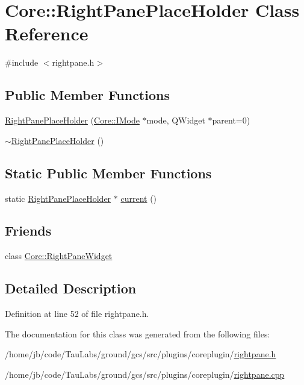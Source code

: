 \hypertarget{class_core_1_1_right_pane_place_holder}{\section{\-Core\-:\-:\-Right\-Pane\-Place\-Holder \-Class \-Reference}
\label{class_core_1_1_right_pane_place_holder}
}


{\ttfamily \#include $<$rightpane.\-h$>$}

\subsection*{\-Public \-Member \-Functions}
\begin{DoxyCompactItemize}
\item 
\hyperlink{group___core_plugin_gaa98e96e4dc0e41e99b50b305ff9fad3f}{\-Right\-Pane\-Place\-Holder} (\hyperlink{class_core_1_1_i_mode}{\-Core\-::\-I\-Mode} $\ast$mode, \-Q\-Widget $\ast$parent=0)
\item 
\hyperlink{group___core_plugin_gaf01c936611ccfda71b72c4cf3018edfd}{$\sim$\-Right\-Pane\-Place\-Holder} ()
\end{DoxyCompactItemize}
\subsection*{\-Static \-Public \-Member \-Functions}
\begin{DoxyCompactItemize}
\item 
static \hyperlink{class_core_1_1_right_pane_place_holder}{\-Right\-Pane\-Place\-Holder} $\ast$ \hyperlink{group___core_plugin_ga78b79d10a15088de40b5fea71c4add4c}{current} ()
\end{DoxyCompactItemize}
\subsection*{\-Friends}
\begin{DoxyCompactItemize}
\item 
class \hyperlink{group___core_plugin_gacfc5dac0611e5189b4f2dcbeface99d1}{\-Core\-::\-Right\-Pane\-Widget}
\end{DoxyCompactItemize}


\subsection{\-Detailed \-Description}


\-Definition at line 52 of file rightpane.\-h.



\-The documentation for this class was generated from the following files\-:\begin{DoxyCompactItemize}
\item 
/home/jb/code/\-Tau\-Labs/ground/gcs/src/plugins/coreplugin/\hyperlink{rightpane_8h}{rightpane.\-h}\item 
/home/jb/code/\-Tau\-Labs/ground/gcs/src/plugins/coreplugin/\hyperlink{rightpane_8cpp}{rightpane.\-cpp}\end{DoxyCompactItemize}
